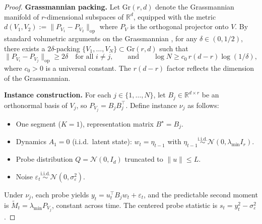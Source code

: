 \documentclass{article}
\newcommand{\R}{\mathbb{R}}
\newcommand{\op}{\mathrm{op}}
\begin{document}
\begin{proof}
\textbf{Grassmannian packing.}
Let $\mathrm{Gr}(r, d)$ denote the Grassmannian manifold of $r$-dimensional subspaces of $\R^d$, equipped with the metric $d(V_1, V_2) := \|P_{V_1} - P_{V_2}\|_{\op}$ where $P_V$ is the orthogonal projector onto $V$.
By standard volumetric arguments on the Grassmannian \citep{szarek1983finite}, for any $\delta \in (0, 1/2)$, there exists a $2\delta$-packing $\{V_1, \ldots, V_N\} \subset \mathrm{Gr}(r, d)$ such that
\begin{equation}
\|P_{V_i} - P_{V_j}\|_{\op} \ge 2\delta \quad \text{for all } i \neq j,
\qquad \text{and} \qquad
\log N \ge c_0\, r(d - r) \log(1/\delta),
\label{eq:packing}
\end{equation}
where $c_0 > 0$ is a universal constant.  The $r(d-r)$ factor reflects the dimension of the Grassmannian.

\textbf{Instance construction.}
For each $j \in \{1, \ldots, N\}$, let $B_j \in \R^{d \times r}$ be an orthonormal basis of $V_j$, so $P_{V_j} = B_j B_j^\top$.  Define instance $\nu_j$ as follows:
\begin{itemize}[nosep]
\item One segment ($K = 1$), representation matrix $B^\star = B_j$.
\item Dynamics $A_1 = 0$ (i.i.d.\ latent state): $w_t = \eta_{t-1}$ with $\eta_{t-1} \stackrel{\mathrm{i.i.d.}}{\sim} \mathcal{N}(0, \lambda_{\min} I_r)$.
\item Probe distribution $Q = \mathcal{N}(0, I_d)$ truncated to $\|u\| \le L$.
\item Noise $\varepsilon_t \stackrel{\mathrm{i.i.d.}}{\sim} \mathcal{N}(0, \sigma_\varepsilon^2)$.
\end{itemize}
Under $\nu_j$, each probe yields $y_t = u_t^\top B_j w_t + \varepsilon_t$, and the predictable second moment is $\widetilde{M}_t = \lambda_{\min} P_{V_j}$, constant across time.  The centered probe statistic is $s_t = y_t^2 - \sigma_\varepsilon^2$.


\end{proof}
\end{document}
